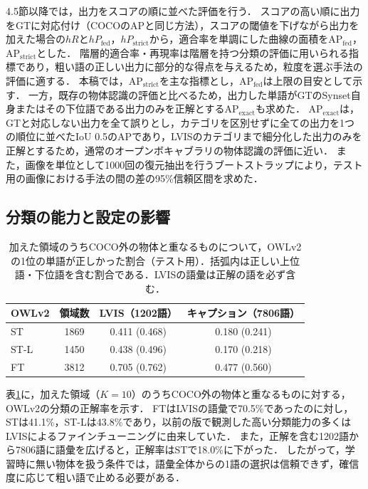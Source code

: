 4.5節以降では，出力をスコアの順に並べた評価を行う．
スコアの高い順に出力をGTに対応付け（COCOのAPと同じ方法），スコアの閾値を下げながら出力を加えた場合の$ hR $と$ hP_{\mathrm{fed}} $，$ hP_{\mathrm{strict}} $から，適合率を単調にした曲線の面積をAP$ _{\mathrm{fed}} $，AP$ _{\mathrm{strict}} $とした．
階層的適合率・再現率は階層を持つ分類の評価に用いられる指標であり\cite{ref_hF}，粗い語の正しい出力に部分的な得点を与えるため，粒度を選ぶ手法の評価に適する．
本稿では，AP$ _{\mathrm{strict}} $を主な指標とし，AP$ _{\mathrm{fed}} $は上限の目安として示す．
一方，既存の物体認識の評価と比べるため，出力した単語がGTのSynset自身またはその下位語である出力のみを正解とするAP$ _{\mathrm{exact}} $も求めた．
AP$ _{\mathrm{exact}} $は，GTと対応しない出力を全て誤りとし，カテゴリを区別せずに全ての出力を1つの順位に並べたIoU 0.5のAPであり，LVISのカテゴリまで細分化した出力のみを正解とするため，通常のオープンボキャブラリの物体認識の評価に近い．
また，画像を単位として1000回の復元抽出を行うブートストラップ\cite{ref_Bootstrap}により，テスト用の画像における手法の間の差の95\%信頼区間を求めた．

\subsection{分類の能力と設定の影響}

\begin{table}[t]
    \vspace{3mm}
    \centering
    \caption{加えた領域のうちCOCO外の物体と重なるものについて，OWLv2の1位の単語が正しかった割合（テスト用）．括弧内は正しい上位語・下位語を含む割合である．LVISの語彙は正解の語を必ず含む．}
    \label{tab_diag}
    \footnotesize
    \begin{tabular}{lccc}
        \toprule
        OWLv2 & 領域数 & LVIS（1202語） & キャプション（7806語） \\
        \midrule
        ST & 1869 & 0.411 (0.468) & 0.180 (0.241) \\
        ST-L & 1450 & 0.438 (0.496) & 0.170 (0.218) \\
        FT & 3812 & 0.705 (0.762) & 0.477 (0.560) \\
        \bottomrule
    \end{tabular}
\end{table}

表\ref{tab_diag}に，加えた領域（$ K = 10 $）のうちCOCO外の物体と重なるものに対する，OWLv2の分類の正解率を示す．
FTはLVISの語彙で70.5\%であったのに対し，STは41.1\%，ST-Lは43.8\%であり，以前の版で観測した高い分類能力の多くはLVISによるファインチューニングに由来していた．
また，正解を含む1202語から7806語に語彙を広げると，正解率はSTで18.0\%に下がった．
したがって，学習時に無い物体を扱う条件では，語彙全体からの1語の選択は信頼できず，確信度に応じて粗い語で止める必要がある．

